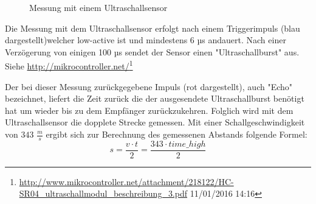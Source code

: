 \begin{figure}[tbh]
  \begin{centering}
  \par\end{centering}
  \caption{Messung mit einem Ultraschallsensor}
  \label{Ultraschallmessung}
\end{figure}

Die Messung mit dem Ultraschallsensor erfolgt nach einem Triggerimpuls (blau dargestellt)welcher low-active ist und mindestens 6 µs andauert. Nach einer Verzögerung von einigen 100 µs sendet der Sensor einen "Ultraschallburst" aus.
\\Siehe \url{http://mikrocontroller.net/}\footnote{\url{http://www.mikrocontroller.net/attachment/218122/HC-SR04_ultraschallmodul_beschreibung_3.pdf} 11/01/2016 14:16}

\needspace{2cm}
Der bei dieser Messung zurückgegebene Impuls (rot dargestellt), auch "Echo" bezeichnet, liefert die Zeit zurück die der ausgesendete Ultraschallburst benötigt hat um wieder bis zu dem Empfänger zurückzukehren. Folglich wird mit dem Ultraschallsensor die dopplete Strecke gemessen.
Mit einer Schallgeschwindigkeit von $343$ $\frac{m}{s}$ ergibt sich zur Berechnung des gemessenen Abstands folgende Formel:
\[
s = \frac{v \cdot t}{2} = \frac{343 \cdot time\_high}{2}
\]
